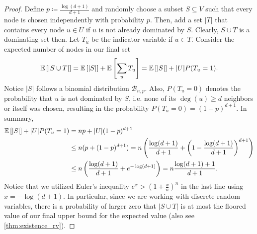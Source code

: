 \begin{aufgabe}
	\begin{proof}
		Define $p \coloneqq \frac{\log(d+1)}{d+1}$ and randomly choose a subset $S \subseteq V$
		such that every node is chosen independently with probability $p$.
		Then, add a set $|T|$ that contains every node $u \in U$ if $u$ is not already dominated by $S$.
		Clearly, $S\cup T$ is a dominating set then.
		Let $T_u$ be the indicator variable if $u \in T$.
		Consider the expected number of nodes in our final set
		\begin{align*}
			\mathbb{E}\left[|S \cup T|\right] = \mathbb{E}\left[|S|\right] + \mathbb{E}\left[\sum_u T_u\right] = \mathbb{E}\left[|S|\right] + |U|P(T_u=1).
		\end{align*}
		Notice $|S|$ follows a binomial distribution $\mathcal{B}_{n,p}$.
		Also, $P(T_u=0)$ denotes the probability that $u$ is not dominated by $S$,
		i.e. none of its $\deg(u) \geq d$ neighbors or itself was chosen, resulting in
		the probability $P(T_u=0) = (1-p)^{d+1}$. In summary,
		\begin{align*}
			\mathbb{E}\left[|S|\right] + |U|P(T_u=1) & = np + |U|(1-p)^{d+1}                                                                                          \\
			                           & \leq n (p + (1-p)^{d+1}) = n \left( \frac{\log(d+1)}{d+1} + \left(1-\frac{\log(d+1)}{d+1}\right)^{d+1} \right) \\
			                           & \leq n \left( \frac{\log(d+1)}{d+1} + e^{-\log(d+1)} \right) = n \frac{\log(d+1) + 1}{d+1}.                    \\
		\end{align*}
		Notice that we utilized Euler's inequality $e^x > (1+ \frac{x}{n})^n$ in the last line using $x = -\log(d+1)$.
		In particular, since we are working with discrete random variables,
		there is a probability of larger zero that $|S \cup T|$ is at most the floored value of our final upper bound for the expected value (also see \autoref{thm:existence_rv}).
	\end{proof}
\end{aufgabe}

